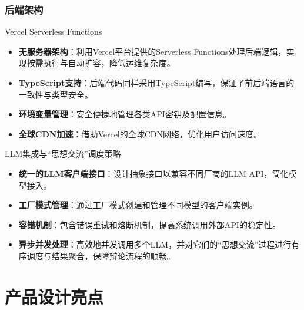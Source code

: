 \documentclass[aspectratio=169]{beamer} %
\begin{document}
\begin{frame}
\frametitle{后端架构}
\begin{block}{Vercel Serverless Functions}
\begin{itemize}
\item \textbf{无服务器架构}：利用Vercel平台提供的Serverless Functions处理后端逻辑，实现按需执行与自动扩容，降低运维复杂度。
\item \textbf{TypeScript支持}：后端代码同样采用TypeScript编写，保证了前后端语言的一致性与类型安全。
\item \textbf{环境变量管理}：安全便捷地管理各类API密钥及配置信息。
\item \textbf{全球CDN加速}：借助Vercel的全球CDN网络，优化用户访问速度。
\end{itemize}
\end{block}

\begin{block}{LLM集成与“思想交流”调度策略}
\begin{itemize}
\item \textbf{统一的LLM客户端接口}：设计抽象接口以兼容不同厂商的LLM API，简化模型接入。
\item \textbf{工厂模式管理}：通过工厂模式创建和管理不同模型的客户端实例。
\item \textbf{容错机制}：包含错误重试和熔断机制，提高系统调用外部API的稳定性。
\item \textbf{异步并发处理}：高效地并发调用多个LLM，并对它们的“思想交流”过程进行有序调度与结果聚合，保障辩论流程的顺畅。
\end{itemize}
\end{block}
\end{frame}

\section{产品设计亮点}
\end{document}
